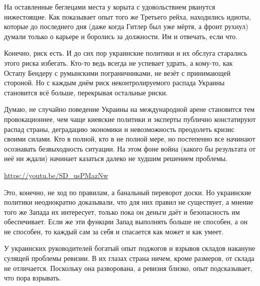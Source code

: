 На оставленные беглецами места у корыта с удовольствием рванутся нижестоящие.
Как показывает опыт того же Третьего рейха, находились идиоты, которые до
последнего дня (даже когда Гитлер был уже мёртв, а фронт рухнул) думали только
о карьере и боролись за должности. Им и отвечать, если что.

Конечно, риск есть. И до сих пор украинские политики и их обслуга старались
этого риска избегать. Кто-то ведь всегда не успевает удрать, а кому-то, как
Остапу Бендеру с румынскими пограничниками, не везёт с принимающей стороной. Но
с каждым днём риск неконтролируемого распада Украины становится всё больше,
перекрывая остальные риски.

Думаю, не случайно поведение Украины на международной арене становится тем
провокационнее, чем чаще киевские политики и эксперты публично констатируют
распад страны, деградацию экономики и невозможность преодолеть кризис своими
силами. Кто в полной, кто в не полной мере, но постепенно все начинают
осознавать безвыходность ситуации. На этом фоне война (какого бы результата от
неё ни ждали) начинает казаться далеко не худшим решением проблемы.

\url{https://youtu.be/SD_usPMazNw}

Это, конечно, не ход по правилам, а банальный переворот доски. Но украинские
политики неоднократно доказывали, что для них правил не существует, а мнение
того же Запада их интересует, только пока он деньги даёт и безопасность им
обеспечивает. Если же эти функции Запад выполнять больше не способен, а он не
способен, то каждый сам за себя и спасается как может и как умеет.

У украинских руководителей богатый опыт поджогов и взрывов складов накануне
сулящей проблемы ревизии. В их глазах страна ничем, кроме размеров, от склада
не отличается. Поскольку она разворована, а ревизия близко, опыт подсказывает,
что пора взрывать.

